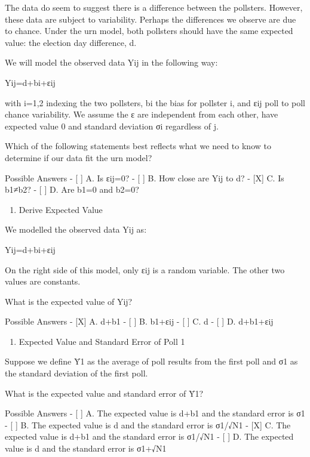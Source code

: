 \documentclass[
]{article}
\providecommand{\tightlist}{%
  \setlength{\itemsep}{0pt}\setlength{\parskip}{0pt}}
\begin{document}
The data do seem to suggest there is a difference between the pollsters.
However, these data are subject to variability. Perhaps the differences
we observe are due to chance. Under the urn model, both pollsters should
have the same expected value: the election day difference, d.

We will model the observed data Yij in the following way:

Yij=d+bi+εij

with i=1,2 indexing the two pollsters, bi the bias for pollster i, and
εij poll to poll chance variability. We assume the ε are independent
from each other, have expected value 0 and standard deviation σi
regardless of j.

Which of the following statements best reflects what we need to know to
determine if our data fit the urn model?

Possible Answers - {[} {]} A. Is εij=0? - {[} {]} B. How close are Yij
to d? - {[}X{]} C. Is b1≠b2? - {[} {]} D. Are b1=0 and b2=0?

\begin{enumerate}
\def\labelenumi{\arabic{enumi}.}
\setcounter{enumi}{7}
\tightlist
\item
  Derive Expected Value
\end{enumerate}

We modelled the observed data Yij as:

Yij=d+bi+εij

On the right side of this model, only εij is a random variable. The
other two values are constants.

What is the expected value of Yij?

Possible Answers - {[}X{]} A. d+b1 - {[} {]} B. b1+εij - {[} {]} C. d -
{[} {]} D. d+b1+εij

\begin{enumerate}
\def\labelenumi{\arabic{enumi}.}
\setcounter{enumi}{8}
\tightlist
\item
  Expected Value and Standard Error of Poll 1
\end{enumerate}

Suppose we define Ȳ1 as the average of poll results from the first poll
and σ1 as the standard deviation of the first poll.

What is the expected value and standard error of Ȳ1?

Possible Answers - {[} {]} A. The expected value is d+b1 and the
standard error is σ1 - {[} {]} B. The expected value is d and the
standard error is σ1/√N1 - {[}X{]} C. The expected value is d+b1 and the
standard error is σ1/√N1 - {[} {]} D. The expected value is d and the
standard error is σ1+√N1
\end{document}
